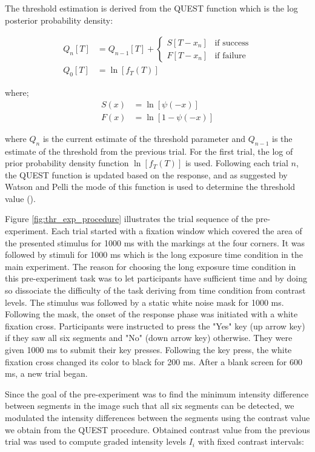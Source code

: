 \documentclass{article}
\begin{document}
The threshold estimation is derived from the QUEST function which is the log posterior probability density:

\begin{align}
Q_n[T] &= Q_{n-1}[T] + 
    \begin{cases}
        S[T - x_n]    & \text{if success} \\
        F[T - x_n]    & \text{if failure}
    \end{cases}    \\
Q_0[T] &= \ln[f_T(T)]
\end{align}

where;
\begin{align}
    S(x) &= \ln [\psi(-x)]  \\
    F(x) &= \ln [1- \psi(-x)]         
\end{align}


where $Q_n$ is the current estimate of the threshold parameter and $Q_{n-1}$ is the estimate of the threshold from the previous trial. For the first trial, the log of prior probability density function  $\ln[f_T(T)]$ is used. Following each trial $n$, the QUEST function is updated based on the response, and as suggested by Watson and Pelli the mode of this function is used to determine the threshold value (\citeyear{watson1983quest}).

Figure \ref{fig:thr_exp_procedure} illustrates the trial sequence of the pre-experiment. Each trial started with a fixation window which covered the area of the presented stimulus for 1000 ms with the markings at the four corners. It was followed by stimuli for 1000 ms which is the long exposure time condition in the main experiment. The reason for choosing the long exposure time condition in this pre-experiment task was to let participants have sufficient time and by doing so dissociate the difficulty of the task deriving from time condition from contrast levels. The stimulus was followed by a static white noise mask for 1000 ms. Following the mask, the onset of the response phase was initiated with a white fixation cross. Participants were instructed to press the "Yes" key (up arrow key) if they saw all six segments and "No" (down arrow key) otherwise. They were given 1000 ms to submit their key presses. Following the key press, the white fixation cross changed its color to black for 200 ms. After a blank screen for 600 ms, a new trial began.

Since the goal of the pre-experiment was to find the minimum intensity difference between segments in the image such that all six segments can be detected, we modulated the intensity differences between the segments using the contrast value we obtain from the QUEST procedure. Obtained contrast value from the previous trial was used to compute graded intensity levels $I_i$ with fixed contrast intervals:
\end{document}
